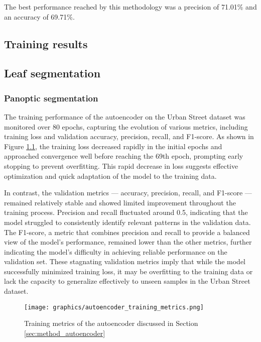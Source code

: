\documentclass[draft,final]{vutinfth} %
\begin{document}
The best performance reached by this methodology was a precision of 71.01\% and an accuracy of 69.71\%. 

\appendix
\begin{appendix}
\chapter{Training results}
\section{Leaf segmentation}
\subsection{Panoptic segmentation} \label{sec:leaf_segmentation_panoptic_training}
The training performance of the autoencoder on the Urban Street dataset \cite{yang_urban_2023} was monitored over 80 epochs, capturing the evolution of various metrics, including training loss and validation accuracy, precision, recall, and F1-score. As shown in Figure \ref{fig:autoencoder_train}, the training loss decreased rapidly in the initial epochs and approached convergence well before reaching the 69th epoch, prompting early stopping to prevent overfitting. This rapid decrease in loss suggests effective optimization and quick adaptation of the model to the training data.

In contrast, the validation metrics — accuracy, precision, recall, and F1-score — remained relatively stable and showed limited improvement throughout the training process. Precision and recall fluctuated around 0.5, indicating that the model struggled to consistently identify relevant patterns in the validation data. The F1-score, a metric that combines precision and recall to provide a balanced view of the model’s performance, remained lower than the other metrics, further indicating the model’s difficulty in achieving reliable performance on the validation set. These stagnating validation metrics imply that while the model successfully minimized training loss, it may be overfitting to the training data or lack the capacity to generalize effectively to unseen samples in the Urban Street dataset.

\begin{figure}
    \centering
    \texttt{[image: graphics/autoencoder\_training\_metrics.png]}
    \caption{Training metrics of the autoencoder discussed in Section \ref{sec:method_autoencoder}}
    \label{fig:autoencoder_train}
\end{figure}


\end{appendix}
\end{document}

